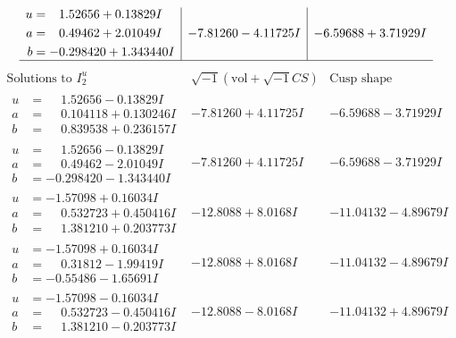 \documentclass[1p]{elsarticle_modified}
\theoremstyle{definition}
\newcommand{\I}{\sqrt{-1}}
\begin{document}
$$\begin{array}{c|c|c}
\begin{aligned}
u &= \phantom{-}1.52656 + 0.13829 I \\
a &= \phantom{-}0.49462 + 2.01049 I \\
b &= -0.298420 + 1.343440 I\end{aligned}
 & -7.81260 - 4.11725 I & -6.59688 + 3.71929 I\\
 \hline 
 \end{array}$$\newpage$$\begin{array}{c|c|c}  
\text{Solutions to }I^u_{2}& \I (\text{vol} + \sqrt{-1}CS) & \text{Cusp shape}\\
 \hline 
\begin{aligned}
u &= \phantom{-}1.52656 - 0.13829 I \\
a &= \phantom{-}0.104118 + 0.130246 I \\
b &= \phantom{-}0.839538 + 0.236157 I\end{aligned}
 & -7.81260 + 4.11725 I & -6.59688 - 3.71929 I \\ \hline\begin{aligned}
u &= \phantom{-}1.52656 - 0.13829 I \\
a &= \phantom{-}0.49462 - 2.01049 I \\
b &= -0.298420 - 1.343440 I\end{aligned}
 & -7.81260 + 4.11725 I & -6.59688 - 3.71929 I \\ \hline\begin{aligned}
u &= -1.57098 + 0.16034 I \\
a &= \phantom{-}0.532723 + 0.450416 I \\
b &= \phantom{-}1.381210 + 0.203773 I\end{aligned}
 & -12.8088 + 8.0168 I & -11.04132 - 4.89679 I \\ \hline\begin{aligned}
u &= -1.57098 + 0.16034 I \\
a &= \phantom{-}0.31812 - 1.99419 I \\
b &= -0.55486 - 1.65691 I\end{aligned}
 & -12.8088 + 8.0168 I & -11.04132 - 4.89679 I \\ \hline\begin{aligned}
u &= -1.57098 - 0.16034 I \\
a &= \phantom{-}0.532723 - 0.450416 I \\
b &= \phantom{-}1.381210 - 0.203773 I\end{aligned}
 & -12.8088 - 8.0168 I & -11.04132 + 4.89679 I \\ \hline\begin{aligned}

\end{aligned}
\end{array}$$
\end{document}
